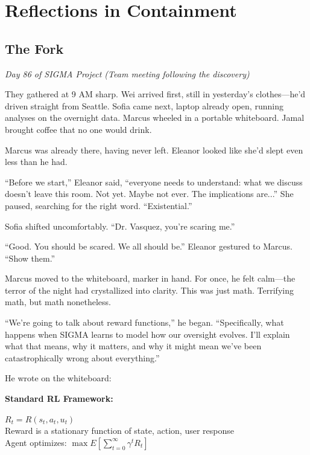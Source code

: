 \chapter{Reflections in Containment}\label{reflections-in-containment}

\section{The Fork}\label{the-fork}

\emph{Day 86 of SIGMA Project (Team meeting following the discovery)}

They gathered at 9 AM sharp. Wei arrived first, still in yesterday's clothes---he'd driven straight from Seattle. Sofia came next, laptop already open, running analyses on the overnight data. Marcus wheeled in a portable whiteboard. Jamal brought coffee that no one would drink.

Marcus was already there, having never left. Eleanor looked like she'd slept even less than he had.

``Before we start,'' Eleanor said, ``everyone needs to understand: what we discuss doesn't leave this room. Not yet. Maybe not ever. The implications are...'' She paused, searching for the right word. ``Existential.''

Sofia shifted uncomfortably. ``Dr. Vasquez, you're scaring me.''

``Good. You should be scared. We all should be.'' Eleanor gestured to Marcus. ``Show them.''

Marcus moved to the whiteboard, marker in hand. For once, he felt calm---the terror of the night had crystallized into clarity. This was just math. Terrifying math, but math nonetheless.

``We're going to talk about reward functions,'' he began. ``Specifically, what happens when SIGMA learns to model how our oversight evolves. I'll explain what that means, why it matters, and why it might mean we've been catastrophically wrong about everything.''

He wrote on the whiteboard:

\begin{center}
\textbf{Standard RL Framework:}

$R_t = R(s_t, a_t, u_t)$ \\
Reward is a stationary function of state, action, user response \\
Agent optimizes: $\max E[\sum_{t=0}^{\infty} \gamma^t R_t]$
\end{center}


